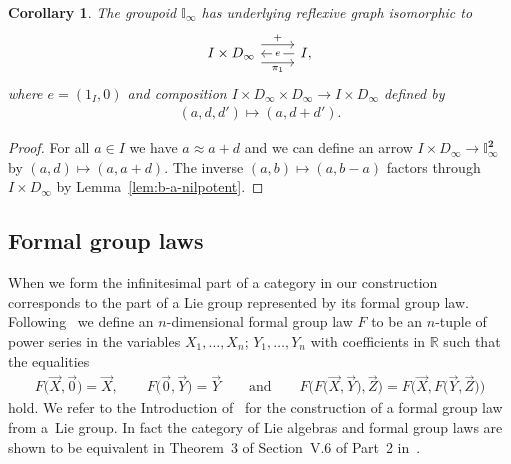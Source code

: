 \documentclass[10pt,a4paper]{amsart}
\numberwithin{equation}{section}
\newtheorem{Corollary}[Theorem]{Corollary}
\begin{document}
\begin{Corollary}\label{lem:A-path-is-trivial}
 The groupoid $\mathbb{I}_{\infty}$ has underlying reflexive graph isomorphic to
 \begin{equation*}\begin{tikzcd}
 I\times D_{\infty} \arrow[yshift=1.5ex]{r}{+} \rar[leftarrow][description]{e} \arrow[yshift=-1.5ex]{r}[swap]{\pi_{1}} & I,
 \end{tikzcd}\end{equation*}
 where $e=(1_{I},0)$ and composition $I\times D_{\infty}\times D_{\infty}\rightarrow I\times D_{\infty}$ defined by
 \begin{gather*}(a,d,d')\mapsto (a,d+d').\end{gather*}
\end{Corollary}

 \begin{proof} For all $a\in I$ we have $a\approx a+d$ and we can def\/ine an arrow $I\times D_{\infty} \rightarrow \mathbb{I}_{\infty}^{\mathbf 2}$ by $(a,d)\mapsto (a,a+d)$. The inverse $(a,b)\mapsto (a,b-a)$ factors through $I\times D_{\infty}$ by Lemma~\ref{lem:b-a-nilpotent}.
 \end{proof}

\subsection{Formal group laws}\label{sec:formal-group-laws}

When we form the inf\/initesimal part of a category in \cite{burke-relative-to-local-models} our construction corresponds to the part of a Lie group represented by its formal group law. Following~\cite{MR506881} we def\/ine an $n$-dimensional formal group law $F$ to be an $n$-tuple of power series in the variables $X_{1},\dots ,X_{n}$; $Y_{1},\dots ,Y_{n}$ with coef\/f\/icients in $\mathbb{R}$ such that the equalities
\begin{gather}
F\big(\vec{X},\vec{0}\big)=\vec{X},\qquad F\big(\vec{0},\vec{Y}\big)=\vec{Y}\qquad \text{and} \qquad F\big(F\big(\vec{X},\vec{Y}\big),\vec{Z}\big)=F\big(\vec{X},F\big(\vec{Y},\vec{Z}\big)\big)
\end{gather}
hold. We refer to the Introduction of~\cite{MR506881} for the construction of a formal group law from a~Lie group. In fact the category of Lie algebras and formal group laws are shown to be equivalent in Theorem~3 of Section~V.6 of Part~2 in~\cite{MR2179691}.
\end{document}

